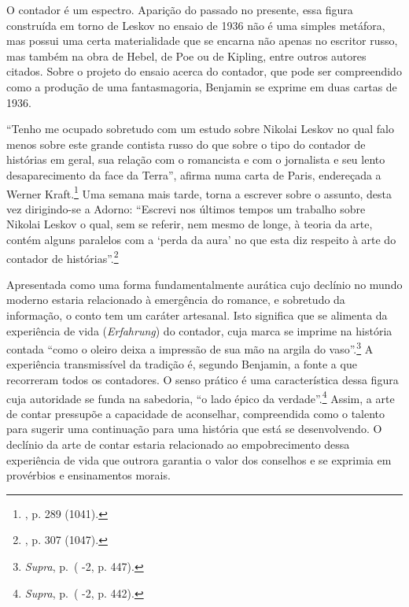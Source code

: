 O contador é um espectro. Aparição do passado no presente, essa figura
construída em torno de Leskov no ensaio de 1936 não é uma simples
metáfora, mas possui uma certa materialidade que se encarna não apenas
no escritor russo, mas também na obra de Hebel, de Poe ou de Kipling,
entre outros autores citados. Sobre o projeto do ensaio acerca do
contador, que pode ser compreendido como a produção de uma
fantasmagoria, Benjamin se exprime em duas cartas de 1936.

``Tenho me ocupado sobretudo com um estudo sobre Nikolai Leskov no qual
falo menos sobre este grande contista russo do que sobre o tipo do
contador de histórias em geral, sua relação com o romancista e com o
jornalista e seu lento desaparecimento da face da Terra'', afirma numa
carta de Paris, endereçada a Werner Kraft.\footnote{ , p. 289 (1041).}
Uma semana mais tarde, torna a escrever sobre o assunto, desta vez
dirigindo-se a Adorno: ``Escrevi nos últimos tempos um trabalho sobre
Nikolai Leskov o qual, sem se referir, nem mesmo de longe, à teoria da
arte, contém alguns paralelos com a `perda da aura' no que esta diz
respeito à arte do contador de histórias''.\footnote{ , p. 307
  (1047).}

Apresentada como uma forma fundamentalmente aurática cujo declínio no
mundo moderno estaria relacionado à emergência do romance, e sobretudo
da informação, o conto tem um caráter artesanal. Isto significa que se
alimenta da experiência de vida (\emph{Erfahrung}) do contador, cuja
marca se imprime na história contada ``como o oleiro deixa a impressão
de sua mão na argila do vaso''.\footnote{\emph{Supra}, p.\,\pageref{supra} ( -2, p.
  447).} A experiência transmissível da tradição é, segundo Benjamin, a
fonte a que recorreram todos os contadores. O senso prático é uma
característica dessa figura cuja autoridade se funda na sabedoria, ``o
lado épico da verdade''.\footnote{\emph{Supra}, p.\,\pageref{supra2} ( -2, p. 442).}
Assim, a arte de contar pressupõe a capacidade de aconselhar,
compreendida como o talento para sugerir uma continuação para uma
história que está se desenvolvendo. O declínio da arte de contar estaria
relacionado ao empobrecimento dessa experiência de vida que outrora
garantia o valor dos conselhos e se exprimia em provérbios e
ensinamentos morais.

